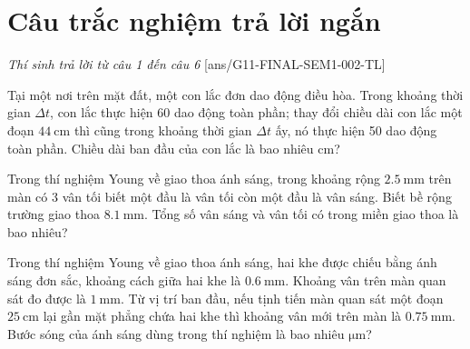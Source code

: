 \section{Câu trắc nghiệm trả lời ngắn} \textit{Thí sinh trả lời từ câu 1 đến câu 6}
\setcounter{ex}{0}
[ans/G11-FINAL-SEM1-002-TL]
\begin{ex}
Tại một nơi trên mặt đất, một con lắc đơn dao động điều hòa. Trong khoảng thời gian $\Delta t$, con lắc thực hiện 60 dao động toàn phần; thay đổi chiều dài con lắc một đoạn $\SI{44}{\centi\meter}$ thì cũng trong khoảng thời gian $\Delta t$ ấy, nó thực hiện 50 dao động toàn phần. Chiều dài ban đầu của con lắc là bao nhiêu $\si{\centi\meter}$? 
\end{ex}
\begin{ex}
Trong thí nghiệm Young về giao thoa ánh sáng, trong khoảng rộng $\SI{2.5}{\milli\meter}$ trên màn có 3 vân tối biết một đầu là vân tối còn một đầu là vân sáng. Biết bề rộng trường giao thoa $\SI{8.1}{\milli\meter}$. Tổng số vân sáng và vân tối có trong miền giao thoa là bao nhiêu?
\end{ex}
\begin{ex}
Trong thí nghiệm Young về giao thoa ánh sáng, hai khe được chiếu bằng ánh sáng đơn sắc, khoảng cách giữa hai khe là $\SI{0.6}{\milli\meter}$. Khoảng vân trên màn quan sát đo được là $\SI{1}{\milli\meter}$. Từ vị trí ban đầu, nếu tịnh tiến màn quan sát một đoạn $\SI{25}{\centi\meter}$ lại gần mặt phẳng chứa hai khe thì khoảng vân mới trên màn là $\SI{0.75}{\milli\meter}$. Bước sóng của ánh sáng dùng trong thí nghiệm là bao nhiêu $\si{\micro\meter}$? 
\end{ex}

